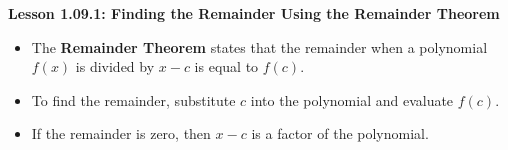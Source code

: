 \begin{center}
\textbf{Lesson 1.09.1: Finding the Remainder Using the Remainder Theorem}
\end{center}

\vspace*{-1.5ex}

\begin{itemize}
    \item The \textbf{Remainder Theorem} states that the remainder when a polynomial \( f(x) \) is divided by \( x - c \) is equal to \( f(c) \).
    \item To find the remainder, substitute \( c \) into the polynomial and evaluate \( f(c) \).
    \item If the remainder is zero, then \( x - c \) is a factor of the polynomial.
\end{itemize}